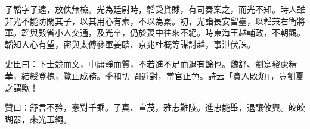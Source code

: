 \begin{pinyinscope}
 子韜字子遠，放佚無檢。光為廷尉時，韜受貨賕，有司奏案之，而光不知。時人雖非光不能防閑其子，以其用心有素，不以為累。初，光詣長安留臺，以韜兼右衛將軍。韜與殿省小人交通，及光卒，仍於喪中往來不絕。時東海王越輔政，不朝觀。韜知人心有望，密與太傅參軍姜賾、京兆杜概等謀討越，事泄伏誅。



 史臣曰：下士競而文，中庸靜而質，不若進不足而退有餘也。魏舒、劉寔發慮精華，結綬登槐，覽止成務。季和切
 問近對，當官正色。詩云「貪人敗類」，豈劉夏之謂歟！



 贊曰：舒言不矜，憙對千乘。子真、宣茂，雅志難陵。進忠能舉，退讓攸興。皎皎瑚器，來光玉繩。



\end{pinyinscope}